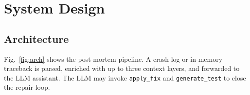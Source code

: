 \documentclass[conference]{IEEEtran}
\begin{document}
\section{System Design}

\subsection{Architecture}
Fig.~\ref{fig:arch} shows the post-mortem pipeline. A crash log or in-memory
traceback is parsed, enriched with up to three context layers, and forwarded
to the LLM assistant.  The LLM may invoke \texttt{apply\_fix} and
\texttt{generate\_test} to close the repair loop.

\end{document}
